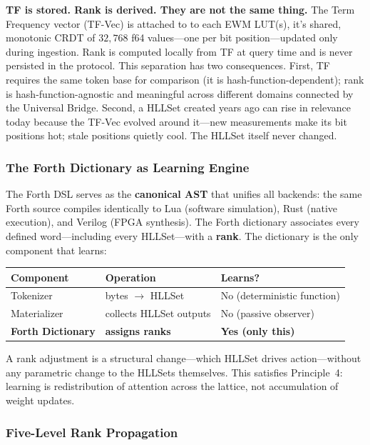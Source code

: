 \documentclass[11pt,a4paper]{article}
\theoremstyle{remark}
\begin{document}
\textbf{TF is stored. Rank is derived. They are not the same thing.}  The Term
Frequency vector (TF-Vec) is attached to to each EWM LUT(s), it's shared, monotonic CRDT of $32{,}768$ f64 values---one
per bit position---updated only during ingestion.  Rank is computed locally from TF
at query time and is never persisted in the protocol.  This separation has two
consequences.  First, TF requires the same token base for comparison (it is
hash-function-dependent); rank is hash-function-agnostic and meaningful across
different domains connected by the Universal Bridge.  Second, a HLLSet created years
ago can rise in relevance today because the TF-Vec evolved around it---new
measurements make its bit positions hot; stale positions quietly cool.  The HLLSet
itself never changed.

\subsubsection{The Forth Dictionary as Learning Engine}

The Forth DSL serves as the \textbf{canonical AST} that unifies all backends: the
same Forth source compiles identically to Lua (software simulation), Rust (native
execution), and Verilog (FPGA synthesis).  The Forth dictionary associates every
defined word---including every HLLSet---with a \textbf{rank}.  The dictionary is the
only component that learns:

\begin{center}
\begin{tabular}{@{}lll@{}}
\toprule
\textbf{Component} & \textbf{Operation} & \textbf{Learns?} \\
\midrule
Tokenizer       & bytes $\to$ HLLSet           & No (deterministic function) \\
Materializer    & collects HLLSet outputs       & No (passive observer) \\
\textbf{Forth Dictionary} & \textbf{assigns ranks} & \textbf{Yes (only this)} \\
\bottomrule
\end{tabular}
\end{center}

A rank adjustment is a structural change---which HLLSet drives action---without any
parametric change to the HLLSets themselves.  This satisfies Principle~4: learning is
redistribution of attention across the lattice, not accumulation of weight updates.

\subsubsection{Five-Level Rank Propagation}
\end{document}
